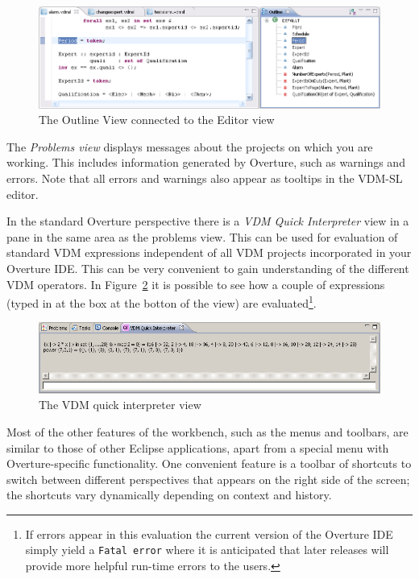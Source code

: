 \begin{figure}[!htb]
\begin{center}
  \includegraphics[width=4.5in]{figures/OutlineView}
  \caption[labelInTOC]{The Outline View connected to the Editor view}
  \label{fig:OutlineView}
\end{center}
\end{figure}

The \emph{Problems view} displays messages about the projects on which
you are working. This includes information generated by Overture, such
as warnings and errors. Note that all errors and warnings also appear
as tooltips in the VDM-SL editor.

In the standard Overture perspective there is a \emph{VDM Quick
  Interpreter} view in a pane in the same area as the problems
view. This can be used for evaluation of standard VDM expressions
independent of all VDM projects incorporated in your Overture
IDE. This can be very convenient to gain understanding of the
different VDM operators. In Figure~\ref{fig:QuickIntView} it is
possible to see how a couple of expressions (typed in at the box at
the botton of the view) are evaluated\footnote{If errors appear in
  this evaluation the current version of the Overture IDE simply yield
  a \texttt{Fatal error} where it is anticipated that later releases
  will provide more helpful run-time errors to the users.}. 

\begin{figure}[!htb]
\begin{center}
  \includegraphics[width=4.5in]{figures/quickinterpreter}
  \caption[labelInTOC]{The VDM quick interpreter view}
  \label{fig:QuickIntView}
\end{center}
\end{figure}

Most of the other features of the workbench, such as the menus and
toolbars, are similar to those of other Eclipse applications, apart
from a special menu with Overture-specific functionality. One
convenient feature is a toolbar of shortcuts to switch between
different perspectives that appears on the right side of the screen;
the shortcuts vary dynamically depending on context and history.

